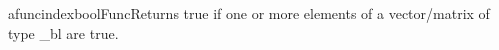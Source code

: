  afunc{indexboolFunc}{Returns true if one or more elements of a vector/matrix of type _bl are true.}
\\\cvsiplh
\\\pyjvsiph